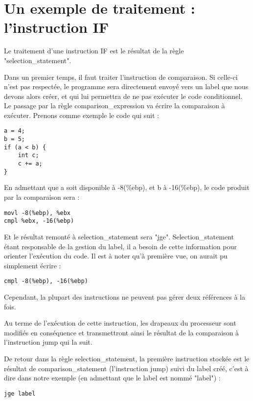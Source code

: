 \vspace{0.5cm}
\section{Un exemple de traitement : l'instruction IF} 

\vspace{0.5cm}
Le traitement d'une instruction IF est le résultat de la règle "selection\_statement".

\vspace{0.5cm}
Dans un premier temps, il faut traiter l'instruction de comparaison. Si celle-ci n'est pas respectée, le programme sera directement envoyé vers un label que nous devons alors créer, et qui lui permettra de ne pas exécuter le code conditionnel.
Le passage par la règle comparison\_expression va écrire la comparaison à exécuter.
Prenons comme exemple le code qui suit :
\begin{verbatim}
a = 4;
b = 5;
if (a < b) {
	int c;
	c += a;
}
\end{verbatim}

En admettant que a soit disponible à -8(\%ebp), et b à -16(\%ebp), le code produit par la comparaison sera :

\begin{verbatim}
movl -8(%ebp), %ebx
cmpl %ebx, -16(%ebp)
\end{verbatim}

Et le résultat remonté à selection\_statement sera "jge". 
Selection\_statement étant responsable de la gestion du label, il a besoin de cette information pour orienter l'exécution du code.
Il est à noter qu'à première vue, on aurait pu simplement écrire : \begin{verbatim}
cmpl -8(%ebp), -16(%ebp)
\end{verbatim}
Cependant, la plupart des instructions ne peuvent pas gérer deux références à la fois.

Au terme de l'exécution de cette instruction, les drapeaux du processeur sont modifiés en conséquence et transmettront ainsi le résultat de la comparaison à l'instruction jump qui la suit.

De retour dans la règle selection\_statement, la première instruction stockée est le résultat de comparison\_statement (l'instruction jump) suivi du label créé, c'est à dire dans notre exemple (en admettant que le label est nommé "label") : 
\begin{verbatim}
jge label
\end{verbatim}

